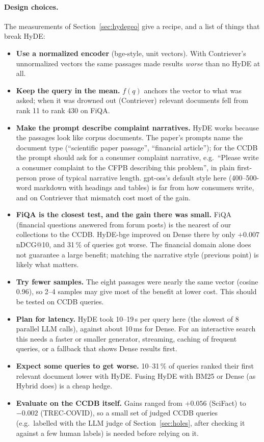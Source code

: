\documentclass[11pt]{article}
\begin{document}
\paragraph{Design choices.} The measurements of Section~\ref{sec:hydegeo} give a recipe, and a list of things that break HyDE:
\begin{itemize}\itemsep 0pt
\item \textbf{Use a normalized encoder} (bge-style, unit vectors). With Contriever's unnormalized
vectors the same passages made results \emph{worse} than no HyDE at all.
\item \textbf{Keep the query in the mean.} $f(q)$ anchors the vector to what was asked; when it was
drowned out (Contriever) relevant documents fell from rank 11 to rank 430 on FiQA.
\item \textbf{Make the prompt describe complaint narratives.} HyDE works because the passages look
like corpus documents. The paper's prompts name the document type (``scientific paper passage'',
``financial article''); for the CCDB the prompt should ask for a consumer complaint narrative, e.g.\
``Please write a consumer complaint to the CFPB describing this problem'', in plain first-person
prose of typical narrative length. gpt-oss's default style here (400--500-word markdown with headings
and tables) is far from how consumers write, and on Contriever that mismatch cost most of the gain.
\item \textbf{FiQA is the closest test, and the gain there was small.} FiQA (financial questions
answered from forum posts) is the nearest of our collections to the CCDB. HyDE-bge improved on Dense
there by only $+0.007$ nDCG@10, and 31\,\% of queries got worse. The financial domain alone does not
guarantee a large benefit; matching the narrative style (previous point) is likely what matters.
\item \textbf{Try fewer samples.} The eight passages were nearly the same vector (cosine 0.96), so
2--4 samples may give most of the benefit at lower cost. This should be tested on CCDB queries.
\item \textbf{Plan for latency.} HyDE took 10--19\,s per query here (the slowest of 8 parallel LLM
calls), against about 10\,ms for Dense. For an interactive search this needs a faster or smaller
generator, streaming, caching of frequent queries, or a fallback that shows Dense results first.
\item \textbf{Expect some queries to get worse.} 10--31\,\% of queries ranked their first relevant
document lower with HyDE. Fusing HyDE with BM25 or Dense (as Hybrid does) is a cheap hedge.
\item \textbf{Evaluate on the CCDB itself.} Gains ranged from $+0.056$ (SciFact) to $-0.002$
(TREC-COVID), so a small set of judged CCDB queries (e.g.\ labelled with the LLM judge of Section~\ref{sec:holes}, after checking it against a few human labels) is needed before relying on it.
\end{itemize}
\end{document}
